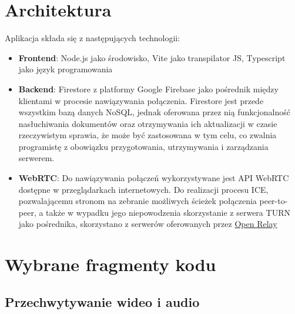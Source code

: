 \section{Architektura}

Aplikacja składa się z następujących technologii:

\begin{itemize}
  \item \textbf{Frontend}: Node.js jako środowisko, Vite jako transpilator JS, Typescript jako język programowania
  \item \textbf{Backend}: Firestore z platformy Google Firebase jako pośrednik między klientami w procesie nawiązywania
        połączenia. Firestore jest przede wszystkim bazą danych NoSQL, jednak oferowana przez nią funkcjonalność
        nasłuchiwania dokumentów oraz otrzymywania ich aktualizacji w czasie rzeczywistym sprawia, że może być
        zastosowana w tym celu, co zwalnia programistę z obowiązku przygotowania, utrzymywania i zarządzania serwerem.
  \item \textbf{WebRTC}: Do nawiązywania połączeń wykorzystywane jest API WebRTC dostępne w przeglądarkach
        internetowych. Do realizacji procesu ICE, pozwalającemu stronom na zebranie możliwych ścieżek połączenia
        peer-to-peer, a także w wypadku jego niepowodzenia skorzystanie z serwera TURN jako pośrednika, skorzystano z
        serwerów oferowanych przez \href{https://www.metered.ca/tools/openrelay/}{Open Relay}
\end{itemize}

\section{Wybrane fragmenty kodu}
\subsection{Przechwytywanie wideo i audio}

